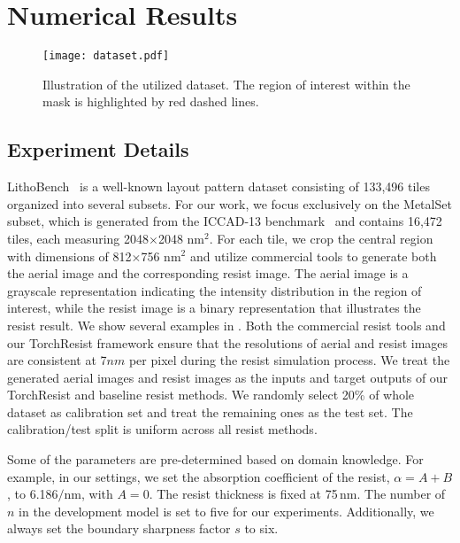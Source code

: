 \section{Numerical Results}


\begin{figure}[t!]
    \centering
    \texttt{[image: dataset.pdf]}
    \caption{Illustration of the utilized dataset. The region of interest within the mask is highlighted by red dashed lines.}
    \label{fig:dataset}
\end{figure}

\subsection{Experiment Details }

 LithoBench~\cite{zheng2024lithobench} is a well-known layout pattern dataset consisting of 133,496 tiles organized into several subsets. For our work, we focus exclusively on the MetalSet subset, which is generated from the ICCAD-13 benchmark~\cite{banerjee2013iccad} and contains 16,472 tiles, each measuring 2048$\times$2048 nm$^2$. For each tile, we crop the central region with dimensions of 812$\times$756 nm$^2$ and utilize commercial tools to generate both the aerial image and the corresponding resist image. The aerial image is a grayscale representation indicating the intensity distribution in the region of interest, while the resist image is a binary representation that illustrates the resist result. We show several examples in . Both the commercial resist tools and our TorchResist framework ensure that the resolutions of aerial and resist images are consistent at 7$nm$ per pixel during the resist simulation process. We treat the generated aerial images and resist images as the inputs and target outputs of our TorchResist and baseline resist methods. We randomly select 20\% of whole dataset as calibration set and treat the remaining ones as the test set. The calibration/test split is uniform across all resist methods.

 Some of the parameters are pre-determined based on domain knowledge. For example, in our settings, we set the absorption coefficient of the resist, $\alpha = A + B$, to 6.186$/\text{nm}$, with $A = 0$. The resist thickness is fixed at 75$\,\text{nm}$. The number of $n$ in the development model is set to five for our experiments. Additionally, we always set the boundary sharpness factor $s$ to six.

